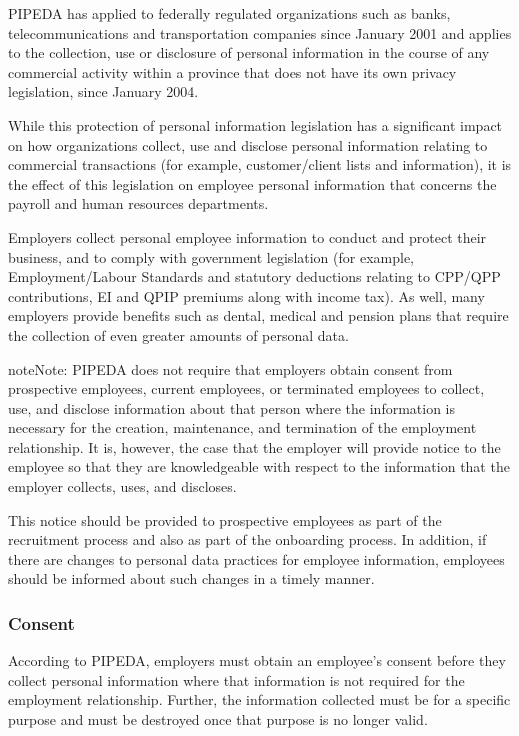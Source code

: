 \documentclass[letterpaper,10pt,english]{sphinxmanual}
\begin{document}
\sphinxAtStartPar
PIPEDA has applied to federally regulated organizations such as banks, telecommunications
and transportation companies since January 2001 and applies to the collection, use or
disclosure of personal information in the course of any commercial activity within a province
that does not have its own privacy legislation, since January 2004.

\sphinxAtStartPar
While this protection of personal information legislation has a significant impact on how
organizations collect, use and disclose personal information relating to commercial
transactions (for example, customer/client lists and information), it is the effect of this
legislation on employee personal information that concerns the payroll and human resources
departments.

\sphinxAtStartPar
Employers collect personal employee information to conduct and protect their business, and
to comply with government legislation (for example, Employment/Labour Standards and
statutory deductions relating to CPP/QPP contributions, EI and QPIP premiums along with
income tax). As well, many employers provide benefits such as dental, medical and pension
plans that require the collection of even greater amounts of personal data.

\begin{sphinxadmonition}{note}{Note:}
\sphinxAtStartPar
PIPEDA does not require that employers obtain consent from prospective employees, current
employees, or terminated employees to collect, use, and disclose information about that
person where the information is necessary for the creation, maintenance, and termination of
the employment relationship. It is, however, the case that the employer will provide notice to
the employee so that they are knowledgeable with respect to the information that the
employer collects, uses, and discloses.

\sphinxAtStartPar
This notice should be provided to prospective employees as part of the recruitment process
and also as part of the on\sphinxhyphen{}boarding process. In addition, if there are changes to personal data
practices for employee information, employees should be informed about such changes in a
timely manner.
\end{sphinxadmonition}


\subsubsection{Consent}
\label{\detokenize{2_compliance:consent}}
\sphinxAtStartPar
According to PIPEDA, employers must obtain an employee’s consent before they collect
personal information where that information is not required for the employment relationship.
Further, the information collected must be for a specific purpose and must be destroyed once
that purpose is no longer valid.
\end{document}
